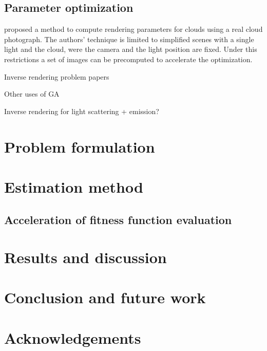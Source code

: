 \documentclass{acmsiggraph}
\begin{document}
\subsection{Parameter optimization}

\cite{Dobashi:2012} proposed a method to compute rendering parameters for clouds using a real cloud photograph.
The authors' technique is limited to simplified scenes with a single light and the cloud, were the camera and the light position are fixed.
Under this restrictions a set of images can be precomputed to accelerate the optimization.

Inverse rendering problem papers

Other uses of GA

Inverse rendering for light scattering + emission?




\section{Problem formulation}

\section{Estimation method}

\subsection{Acceleration of fitness function evaluation}

\section{Results and discussion}

\section{Conclusion and future work}

\section*{Acknowledgements}


\nocite{*}

\end{document}

